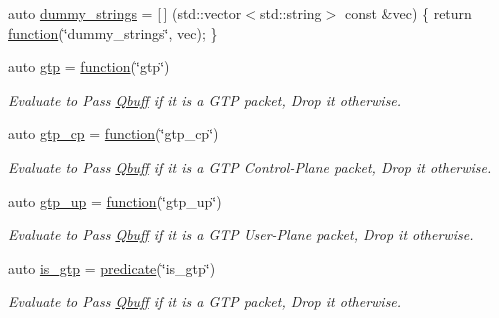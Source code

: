 \begin{DoxyCompactItemize}
\item 
auto \hyperlink{namespacepfq_1_1lang_1_1experimental_1_1anonymous__namespace_02experimental_8hpp_03_af6c041f2494f9dd06acb73d42524e3ad}{dummy\+\_\+strings} = \mbox{[}$\,$\mbox{]} (std\+::vector$<$std\+::string$>$ const \&vec) \{ return \hyperlink{namespacepfq_1_1lang_a1a4638059d700ae08d0ca63886ff2bb3}{function}(\char`\"{}dummy\+\_\+strings\char`\"{}, vec); \}
\item 
auto \hyperlink{namespacepfq_1_1lang_1_1experimental_1_1anonymous__namespace_02experimental_8hpp_03_abd26824e1b0e6a31ddbba793b727ef8f}{gtp} = \hyperlink{namespacepfq_1_1lang_a1a4638059d700ae08d0ca63886ff2bb3}{function}(\char`\"{}gtp\char`\"{})
\begin{DoxyCompactList}\small\item\em Evaluate to {\ttfamily Pass} \hyperlink{structpfq_1_1lang_1_1Qbuff}{Qbuff} if it is a G\+TP packet, {\ttfamily Drop} it otherwise. \end{DoxyCompactList}\item 
auto \hyperlink{namespacepfq_1_1lang_1_1experimental_1_1anonymous__namespace_02experimental_8hpp_03_a209a0ce5245cb37a38e0e4c6616e3604}{gtp\+\_\+cp} = \hyperlink{namespacepfq_1_1lang_a1a4638059d700ae08d0ca63886ff2bb3}{function}(\char`\"{}gtp\+\_\+cp\char`\"{})
\begin{DoxyCompactList}\small\item\em Evaluate to {\ttfamily Pass} \hyperlink{structpfq_1_1lang_1_1Qbuff}{Qbuff} if it is a G\+TP Control-\/\+Plane packet, {\ttfamily Drop} it otherwise. \end{DoxyCompactList}\item 
auto \hyperlink{namespacepfq_1_1lang_1_1experimental_1_1anonymous__namespace_02experimental_8hpp_03_ac8b95a754c8c3bbef4847904eaf6cb9b}{gtp\+\_\+up} = \hyperlink{namespacepfq_1_1lang_a1a4638059d700ae08d0ca63886ff2bb3}{function}(\char`\"{}gtp\+\_\+up\char`\"{})
\begin{DoxyCompactList}\small\item\em Evaluate to {\ttfamily Pass} \hyperlink{structpfq_1_1lang_1_1Qbuff}{Qbuff} if it is a G\+TP User-\/\+Plane packet, {\ttfamily Drop} it otherwise. \end{DoxyCompactList}\item 
auto \hyperlink{namespacepfq_1_1lang_1_1experimental_1_1anonymous__namespace_02experimental_8hpp_03_a2eb9e54a6fc6170b246cf3149445a2c4}{is\+\_\+gtp} = \hyperlink{namespacepfq_1_1lang_aca9adafc436b7f851621b979fa1aaf88}{predicate}(\char`\"{}is\+\_\+gtp\char`\"{})
\begin{DoxyCompactList}\small\item\em Evaluate to {\ttfamily Pass} \hyperlink{structpfq_1_1lang_1_1Qbuff}{Qbuff} if it is a G\+TP packet, {\ttfamily Drop} it otherwise. \end{DoxyCompactList}\item 

\end{DoxyCompactItemize}
